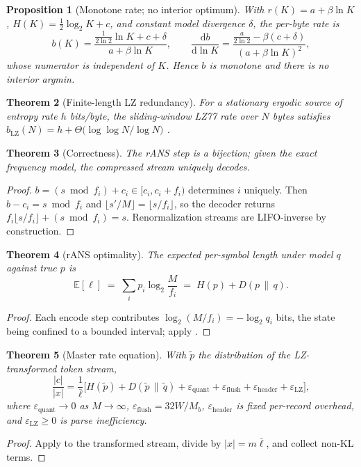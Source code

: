 \documentclass[10pt,twocolumn]{article}
\theoremstyle{plain}
\newtheorem{theorem}{Theorem}[section]
\newtheorem{proposition}[theorem]{Proposition}
\theoremstyle{definition}
\newcommand{\KL}[2]{D\!\left(#1 \,\|\, #2\right)}
\begin{document}
\begin{proposition}[Monotone rate; no interior optimum]\label{prop:knee}
With $r(K) = a + \beta\ln K$, $H(K) = \tfrac12\log_2 K + c$, and constant model
divergence $\delta$, the per-byte rate is
\[
b(K) = \frac{\tfrac{1}{2\ln 2}\ln K + c + \delta}{a + \beta \ln K},
\qquad
\frac{\mathrm{d}b}{\mathrm{d}\ln K}
= \frac{\tfrac{a}{2\ln 2} - \beta(c+\delta)}{(a+\beta\ln K)^2},
\]
whose numerator is independent of $K$. Hence $b$ is monotone and there is no
interior argmin.
\end{proposition}

\begin{theorem}[Finite-length LZ redundancy]\label{thm:lzrate}
For a stationary ergodic source of entropy rate $h$ bits/byte, the sliding-window
LZ77 rate over $N$ bytes satisfies
$b_{\mathrm{LZ}}(N) = h + \Theta\!\big(\log\log N / \log N\big)$
\cite{wynerziv1994,louchard1997}.
\end{theorem}

\begin{theorem}[Correctness]\label{thm:rans-correct}
The rANS step is a bijection; given the exact frequency model, the compressed
stream uniquely decodes.
\end{theorem}
\begin{proof}
$b = (s \bmod f_i) + c_i \in [c_i, c_i+f_i)$ determines $i$ uniquely. Then
$b - c_i = s \bmod f_i$ and $\lfloor s'/M\rfloor = \lfloor s/f_i\rfloor$, so the
decoder returns $f_i\lfloor s/f_i\rfloor + (s \bmod f_i) = s$. Renormalization
streams are LIFO-inverse by construction.
\end{proof}

\begin{theorem}[rANS optimality]\label{thm:rans-opt}
The expected per-symbol length under model $q$ against true $p$ is
\[
\mathbb{E}[\ell] \;=\; \sum_i p_i \log_2 \frac{M}{f_i} \;=\; H(p) + \KL{p}{q}.
\]
\end{theorem}
\begin{proof}
Each encode step contributes $\log_2(M/f_i) = -\log_2 q_i$ bits, the state being
confined to a bounded interval; apply .
\end{proof}

\begin{theorem}[Master rate equation]\label{thm:master}
With $\tilde p$ the distribution of the LZ-transformed token stream,
\[
\frac{|c|}{|x|} = \frac{1}{\bar\ell}\Big[
H(\tilde p) + \KL{\tilde p}{\tilde q}
+ \varepsilon_{\mathrm{quant}} + \varepsilon_{\mathrm{flush}}
+ \varepsilon_{\mathrm{header}} + \varepsilon_{\mathrm{LZ}}
\Big],
\]
where $\varepsilon_{\mathrm{quant}} \to 0$ as $M \to \infty$,
$\varepsilon_{\mathrm{flush}} = 32W/M_b$, $\varepsilon_{\mathrm{header}}$ is fixed
per-record overhead, and $\varepsilon_{\mathrm{LZ}} \ge 0$ is parse inefficiency.
\end{theorem}
\begin{proof}
Apply  to the transformed stream, divide by
$|x| = m\bar\ell$, and collect non-KL terms.
\end{proof}
\end{document}
